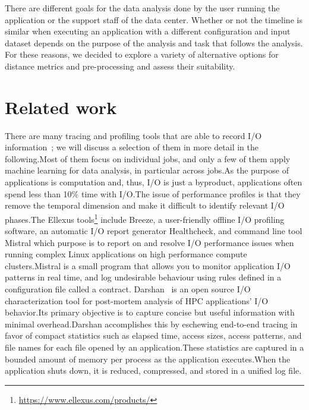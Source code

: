 \documentclass{jhps}
\begin{document}
There are different goals for the data analysis done by the user running the application or the support staff of the data center.
Whether or not the timeline is similar when executing an application with a different configuration and input dataset depends on the purpose of the analysis and task that follows the analysis.
For these reasons, we decided to explore a variety of alternative options for distance metrics and pre-processing and assess their suitability.


\section{Related work}
There are many tracing and profiling tools that are able to record I/O information~\cite{TFAPIKBBCF19}; we will discuss a selection of them in more detail in the following.Most of them focus on individual jobs, and only a few of them apply machine learning for data analysis, in particular across jobs.As the purpose of applications is computation and, thus, I/O is just a byproduct, applications often spend less than 10\% time with I/O.The issue of performance profiles is that they remove the temporal dimension and make it difficult to identify relevant I/O phases.The Ellexus tools\footnote{\url{https://www.ellexus.com/products/}} include Breeze, a user-friendly offline I/O profiling software, an automatic I/O report generator Healthcheck, and command line tool Mistral which purpose is to report on and resolve I/O performance issues when running complex Linux applications on high performance compute clusters.Mistral is a small program that allows you to monitor application I/O patterns in real time, and log undesirable behaviour using rules defined in a configuration file called a contract.
Darshan~\cite{carns2011understanding-toc,hpcdarshan} is an open source I/O characterization tool for post-mortem analysis of HPC applications' I/O behavior.Its primary objective is to capture concise but useful information with minimal overhead.Darshan accomplishes this by eschewing end-to-end tracing in favor of compact statistics such as elapsed time, access sizes, access patterns, and file names for each file opened by an application.These statistics are captured in a bounded amount of memory per process as the application executes.When the application shuts down, it is reduced, compressed, and stored in a unified log file.%
\end{document}

